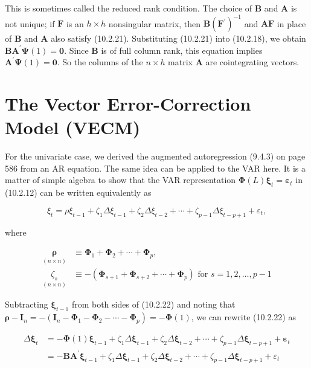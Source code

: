 \documentclass[10pt]{article}
\begin{document}
This is sometimes called the reduced rank condition. The choice of $\mathbf{B}$ and $\mathbf{A}$ is not unique; if $\mathbf{F}$ is an $h \times h$ nonsingular matrix, then $\mathbf{B}\left(\mathbf{F}^{\prime}\right)^{-1}$ and $\mathbf{A F}$ in place of $\mathbf{B}$ and $\mathbf{A}$ also satisfy (10.2.21). Substituting (10.2.21) into (10.2.18), we obtain $\mathbf{B A}^{\prime} \boldsymbol{\Psi}(1)=\mathbf{0}$. Since $\mathbf{B}$ is of full column rank, this equation implies $\mathbf{A}^{\prime} \boldsymbol{\Psi}(1)=\mathbf{0}$. So the columns of the $n \times h$ matrix $\mathbf{A}$ are cointegrating vectors.

\section*{The Vector Error-Correction Model (VECM)}
For the univariate case, we derived the augmented autoregression (9.4.3) on page 586 from an AR equation. The same idea can be applied to the VAR here. It is a matter of simple algebra to show that the VAR representation $\boldsymbol{\Phi}(L) \boldsymbol{\xi}_{t}=\boldsymbol{\varepsilon}_{t}$ in (10.2.12) can be written equivalently as


\begin{equation*}
\xi_{t}=\rho \xi_{t-1}+\zeta_{1} \Delta \xi_{t-1}+\zeta_{2} \Delta \xi_{t-2}+\cdots+\zeta_{p-1} \Delta \xi_{t-p+1}+\varepsilon_{t}, \tag{10.2.22}
\end{equation*}


where


\begin{align*}
\underset{(n \times n)}{\boldsymbol{\rho}} & \equiv \boldsymbol{\Phi}_{1}+\boldsymbol{\Phi}_{2}+\cdots+\boldsymbol{\Phi}_{p},  \tag{10.2.23}\\
\underset{(n \times n)}{\zeta_{s}} & \equiv-\left(\boldsymbol{\Phi}_{s+1}+\boldsymbol{\Phi}_{s+2}+\cdots+\boldsymbol{\Phi}_{p}\right) \text { for } s=1,2, \ldots, p-1 \tag{10.2.24}
\end{align*}


Subtracting $\boldsymbol{\xi}_{t-1}$ from both sides of (10.2.22) and noting that $\boldsymbol{\rho}-\mathbf{I}_{n}=-\left(\mathbf{I}_{n}-\right. \left.\boldsymbol{\Phi}_{1}-\boldsymbol{\Phi}_{2}-\cdots-\boldsymbol{\Phi}_{p}\right)=-\boldsymbol{\Phi}(1)$, we can rewrite (10.2.22) as


\begin{align*}
\Delta \boldsymbol{\xi}_{t} & =-\boldsymbol{\Phi}(1) \boldsymbol{\xi}_{t-1}+\zeta_{1} \Delta \boldsymbol{\xi}_{t-1}+\zeta_{2} \Delta \boldsymbol{\xi}_{t-2}+\cdots+\zeta_{p-1} \Delta \boldsymbol{\xi}_{t-p+1}+\boldsymbol{\varepsilon}_{t} \\
& =-\mathbf{B} \mathbf{A}^{\prime} \boldsymbol{\xi}_{t-1}+\zeta_{1} \Delta \boldsymbol{\xi}_{t-1}+\zeta_{2} \Delta \boldsymbol{\xi}_{t-2}+\cdots+\zeta_{p-1} \Delta \boldsymbol{\xi}_{t-p+1}+\varepsilon_{t} \tag{10.2.25}
\end{align*}
\end{document}

